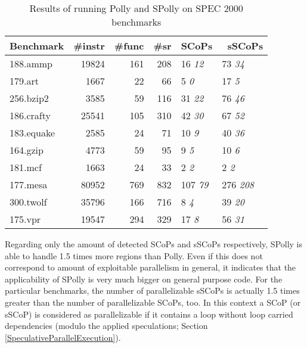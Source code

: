 \begin{table}[htbp]
  \centering
  \begin{framed}
  \caption{Results of running Polly and SPolly on SPEC 2000 benchmarks}
  \begin{tabularx}{0.81\textwidth}{l | r | r | r | X | X }
    \textbf{Benchmark} &\textbf{\#instr} & \textbf{\#func} &\textbf{\#sr} &\centering \textbf{SCoPs}& \textbf{\ sSCoPs} \\
    \hline
    \hline
  188.ammp   & 19824 & 161 &  208 & 16 \hfill \textit{12}  & 73 \hfill \textit{34}  \\
  179.art    &  1667 &  22 &   66 & 5 \hfill \textit{0}    & 17 \hfill \textit{5}   \\
  256.bzip2  &  3585 &  59 &  116 & 31 \hfill \textit{22}  & 76 \hfill \textit{46}  \\
  186.crafty & 25541 & 105 &  310 & 42 \hfill \textit{30}  & 67 \hfill \textit{52}  \\
  183.equake &  2585 &  24 &   71 & 10 \hfill \textit{9}   & 40 \hfill \textit{36}  \\
  164.gzip   &  4773 &  59 &   95 & 9 \hfill \textit{5}    & 10 \hfill \textit{6}   \\
  181.mcf    &  1663 &  24 &   33 & 2 \hfill \textit{2}    & 2  \hfill \textit{2}   \\
  177.mesa   & 80952 & 769 &  832 & 107 \hfill \textit{79} & 276 \hfill \textit{208}\\
  300.twolf  & 35796 & 166 &  716 & 8 \hfill \textit{4}    & 39 \hfill \textit{20}  \\
  175.vpr    & 19547 & 294 &  329 & 17 \hfill \textit{8}   & 56 \hfill \textit{31}  \\
  \end{tabularx}
  \label{tab:TAB}
  \end{framed}
\end{table}

Regarding only the amount of detected SCoPs and sSCoPs respectively, SPolly is 
able to handle 1.5 times more regions than Polly. Even if this does not
correspond to amount of exploitable parallelism in general, 
it indicates that the applicability of SPolly is very much bigger on general
purpose code. For the particular benchmarks, the number of parallelizable sSCoPs 
is actually 1.5 times greater than the number of parallelizable SCoPs, too.
In this context a SCoP (or sSCoP) is considered as parallelizable if it contains
a loop without loop carried dependencies (modulo the applied speculations; Section \ref{SpeculativeParallelExecution}).

